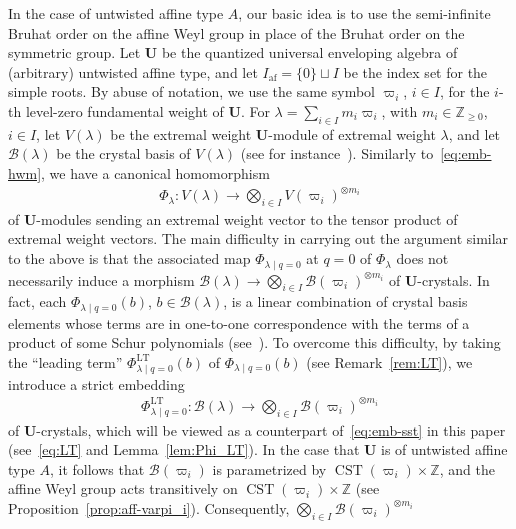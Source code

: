 \documentclass[10pt]{amsart}
\theoremstyle{definition}\newtheorem{defi}[theo]{Definition}
\theoremstyle{remark}\newtheorem{rema}[theo]{Remark}
\newcommand{\BZ}{\mathbb{Z}}
\newcommand{\U}{\mathbf{U}}
\DeclareMathOperator{\af}{af}
\DeclareMathOperator{\LT}{LT}
\DeclareMathOperator{\CST}{CST}
\begin{document}
In the case of untwisted affine type $A$, 
our basic idea is to use 
the semi-infinite Bruhat order on the affine Weyl group 
in place of the Bruhat order on the symmetric group. 
Let 
$\U$ 
be the quantized universal enveloping algebra of (arbitrary) untwisted affine type, 
and let 
$I_{\af} = \{ 0 \} \sqcup I$
be the index set for the simple roots.
By abuse of notation, we use the same symbol 
$\varpi_i$, $i \in I$, 
for the $i$-th level-zero fundamental weight of $\U$. 
For 
$\lambda = \sum_{i \in I} m_i \varpi_i$, 
with 
$m_i \in \BZ_{\geq 0}$, $i \in I$, 
let 
$V(\lambda)$ 
be the extremal weight $\U$-module 
of extremal weight $\lambda$, 
and let 
$\mathcal{B}(\lambda)$ 
be the crystal basis of 
$V(\lambda)$ 
(see for instance~\cite[\S~3.1]{K02}). 
Similarly to~\eqref{eq:emb-hwm}, 
we have a canonical homomorphism 
\begin{align}
\Phi_{\lambda} : 
V(\lambda) 
\longrightarrow 
\bigotimes_{i \in I} V(\varpi_i)^{\otimes m_i}
\end{align}
of $\U$-modules sending an extremal weight vector to the tensor product of extremal weight vectors. 
The main difficulty in carrying out the argument similar to the above is that the associated map 
$\Phi_{\lambda \mid q=0}$ 
at 
$q = 0$ 
of 
$\Phi_{\lambda}$ 
does not necessarily induce a morphism 
$\mathcal{B}(\lambda) \rightarrow \bigotimes_{i \in I} \mathcal{B}(\varpi_i)^{\otimes m_i}$
of $\U$-crystals. 
In fact, each 
$\Phi_{\lambda \mid q=0}(b)$, 
$b \in \mathcal{B}(\lambda)$, 
is a linear combination of crystal basis elements 
whose terms are in one-to-one correspondence with 
the terms of a product of some Schur polynomials 
(see~\cite[\S~4.2]{BN04}). 
To overcome this difficulty, 
by taking the ``leading term'' 
$\Phi_{\lambda \mid q=0}^{\LT }(b)$ 
of 
$\Phi_{\lambda \mid q=0}(b)$
(see Remark~\ref{rem:LT}), 
we introduce a strict embedding 
\begin{align} \label{eq:intro-LT}
\Phi_{\lambda \mid q=0}^{\LT } : 
\mathcal{B}(\lambda) 
\longrightarrow 
\bigotimes_{i \in I} \mathcal{B}(\varpi_i)^{\otimes m_i}
\end{align}
of $\U$-crystals, 
which will be viewed as a counterpart of~\eqref{eq:emb-sst} in this paper 
(see~\eqref{eq:LT} and Lemma~\ref{lem:Phi_LT}). 
In the case that $\U$ is of untwisted affine type $A$, 
it follows that 
$\mathcal{B}(\varpi_i)$
is parametrized by 
$\CST (\varpi_i) \times \BZ$, 
and the affine Weyl group acts transitively on 
$\CST (\varpi_i) \times \BZ$ 
(see Proposition~\ref{prop:aff-varpi_i}). 
Consequently, 
$\bigotimes_{i \in I} \mathcal{B}(\varpi_i)^{\otimes m_i}$ 
\end{document}
